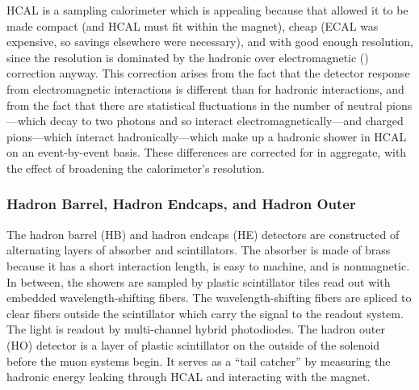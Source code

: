 HCAL is a sampling calorimeter which is appealing because that allowed it to be
made compact (and HCAL must fit within the magnet), cheap (ECAL was expensive,
so savings elsewhere were necessary), and with good enough resolution, since
the resolution is dominated by the hadronic over electromagnetic (\HOverE)
correction anyway. This correction arises from the fact that the detector
response from electromagnetic interactions is different than for hadronic
interactions, and from the fact that there are statistical fluctuations in the
number of neutral pions---which decay to two photons and so interact
electromagnetically---and charged pions---which interact hadronically---which
make up a hadronic shower in HCAL on an event-by-event basis. These differences
are corrected for in aggregate, with the effect of broadening the calorimeter's
resolution.

\subsubsection{Hadron Barrel, Hadron Endcaps, and Hadron Outer}

The hadron barrel (HB) and hadron endcaps (HE) detectors are constructed of
alternating layers of absorber and scintillators. The absorber is made of brass
because it has a short interaction length, is easy to machine, and is
nonmagnetic. In between, the showers are sampled by plastic scintillator tiles
read out with embedded wavelength-shifting fibers. The wavelength-shifting
fibers are spliced to clear fibers outside the scintillator which carry the
signal to the readout system. The light is readout by multi-channel hybrid
photodiodes. The hadron outer (HO) detector is a layer of plastic scintillator
on the outside of the solenoid before the muon systems begin. It serves as a
``tail catcher'' by measuring the hadronic energy leaking through HCAL and
interacting with the magnet.


